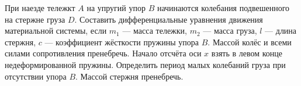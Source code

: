 При наезде тележкт $A$ на упругий упор $B$ начинаются колебания
подвешенного на стержне груза $D$.
Составить дифференциальные уравнения движения материальной системы,
если $m_1$ --- масса тележки, $m_2$ --- масса груза, $l$ --- длина стержня,
$c$ --- коэффициент жёсткости пружины упора $B$.
Массой колёс и всеми силами сопротивления пренебречь.
Начало отсчёта оси $x$ взять в левом конце недеформированной пружины.
Определить период малых колебаний груза при отсутствии упора $B$.
Массой стержня пренебречь.
